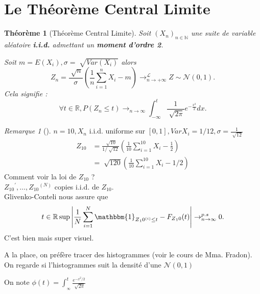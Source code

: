 \documentclass{article}
\theoremstyle{plain}%
\newtheorem{thm}{Théorème}[section]
\theoremstyle{definition}
\theoremstyle{remark}
\newtheorem*{rem}{Remarque}
\begin{document}
\section{Le Théorème Central Limite}
\begin{thm}[Théorème Central Limite]
    Soit $ (X_n)_{n \in \mathbb{N}} $ une suite de variable aléatoire \textbf{i.i.d.} admettant un \textbf{moment d'ordre 2}.

    Soit $ m = E(X_i), \sigma = \sqrt[]{Var(X_i)} $ alors 
    \[
        Z_n = \frac{\sqrt[]{n}}{\sigma }(\frac{1}{n}\sum_{i=1}^{n}X_i-m) \to_{n \to +\infty }^{\mathcal{L}} Z \sim \mathcal{N}(0,1)
    .\]
    Cela signifie : 
    \[
        \forall t \in \mathbb{R}, P(Z_n \leq t) \to_{n \to \infty }\int_{-\infty }^{t}\frac{1}{\sqrt[]{2 \pi }}e^{-\frac{x^2}{2}}dx
    .\]
\end{thm}
\begin{rem}[]
    $ n=10, X_n $ i.i.d. uniforme sur $ [0,1], Var X_i = 1/12, \sigma = \frac{1}{\sqrt[]{12}} $
    \begin{align*}
        Z{_10} &= \frac{\sqrt[]{10}}{1/\sqrt[]{12}}(\frac{1}{10} \sum_{i=1}^{10}X_i - \frac{1}{2}) \\
            &= \sqrt[]{120}(\frac{1}{10} \sum_{i=1}^{10}X_i - 1/2) 
    \end{align*}
    Comment voir la loi de $ Z{_10} $ ? \\
    $ Z{_10}^\prime, \dots, Z{_10}^{(N)} $ copies i.i.d. de $ Z{_10} $. \\
    Glivenko-Conteli nous assure que 
    \[
        t \in \mathbb{R} \sup \left| \frac{1}{N} \sum_{i=1}^{N} \mathbbm{1}_{Z{_10}^{(i)} \leq t} - F_{Z{_10}}(t)\right| \to_{n \to \infty }^{p.s} 0
    .\]
    C'est bien mais super visuel.

    A la place, on préfère tracer des histogrammes (voir le cours de Mma. Fradon). On regarde si l'histogrammes suit la densité d'une $ \mathcal{N}(0,1) $ 
\end{rem}
On note $ \phi (t) = \int_{_\infty }^{t}\frac{e^{-x^2 /2}}{\sqrt[]{2 \pi }} $ 
\end{document}
